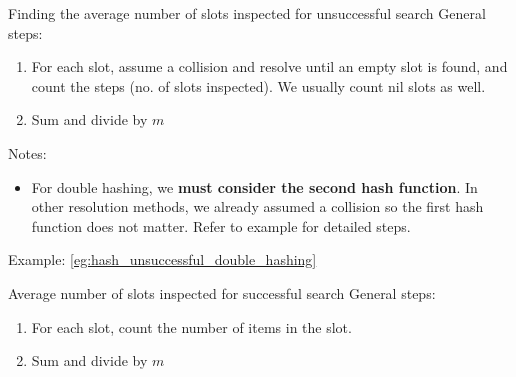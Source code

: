 \begin{theorem}
    {Finding the average number of slots inspected for unsuccessful search}
    General steps:
    \begin{enumerate}
        \item For each slot, assume a collision and resolve until an empty slot is found, and count the steps (no. of slots inspected). We usually count nil slots as well.
        \item Sum and divide by $m$
    \end{enumerate}
    Notes:
    \begin{itemize}
        \item For double hashing, we \textbf{must consider the second hash function}. In other resolution methods, we already assumed a collision so the first hash function does not matter. Refer to example for detailed steps.
    \end{itemize}
    \tcblower
    Example: \ref{eg:hash_unsuccessful_double_hashing}
\end{theorem}
\label{thm:hash_unsuccessful_average_slots_inspected}

\begin{theorem}
    {Average number of slots inspected for successful search}
    General steps:
    \begin{enumerate}
        \item For each slot, count the number of items in the slot.
        \item Sum and divide by $m$
    \end{enumerate}
\end{theorem}


